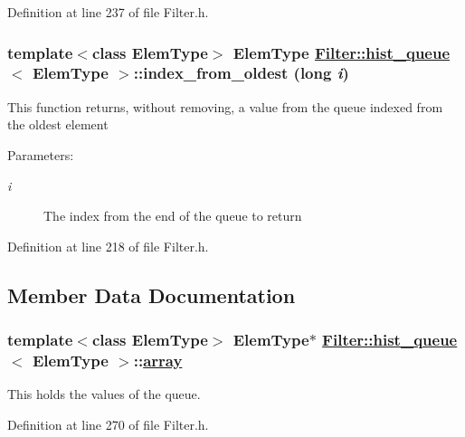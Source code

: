 Definition at line 237 of file Filter.h.\hypertarget{classFilter_1_1hist__queue_a4}{
\subsubsection[index\_\-from\_\-oldest]{\setlength{\rightskip}{0pt plus 5cm}template$<$class Elem\-Type$>$ Elem\-Type \hyperlink{classFilter_1_1hist__queue}{Filter::hist\_\-queue}$<$ Elem\-Type $>$::index\_\-from\_\-oldest (long {\em i})}}
\label{classFilter_1_1hist__queue_a4}


This function returns, without removing, a value from the queue indexed from the oldest element

\begin{Desc}
\item[Parameters:]
\begin{description}
\item[{\em i}]The index from the end of the queue to return \end{description}
\end{Desc}


Definition at line 218 of file Filter.h.

\subsection{Member Data Documentation}
\hypertarget{classFilter_1_1hist__queue_r3}{
\subsubsection[array]{\setlength{\rightskip}{0pt plus 5cm}template$<$class Elem\-Type$>$ Elem\-Type$\ast$ \hyperlink{classFilter_1_1hist__queue}{Filter::hist\_\-queue}$<$ Elem\-Type $>$::\hyperlink{classFilter_1_1hist__queue_r3}{array}}}
\label{classFilter_1_1hist__queue_r3}


This holds the values of the queue. 

Definition at line 270 of file Filter.h.

